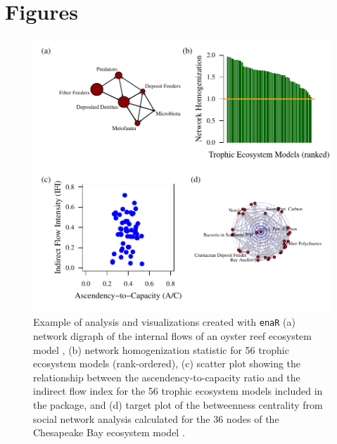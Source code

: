 \documentclass[11pt]{article}
\newcommand{\enaR}{\texttt{enaR}}
\begin{document}
\section{Figures}

\begin{figure}[h]
\includegraphics[scale=1]{../figures/enaR_plot_example.pdf}
\caption{Example of analysis and visualizations created with \enaR\:
  (a) network digraph of the internal flows of an oyster reef
  ecosystem model \citep{dame81}, (b) network homogenization statistic
  for 56 trophic ecosystem models (rank-ordered), (c) scatter plot
  showing the relationship between the ascendency-to-capacity ratio
  and the indirect flow index for the 56 trophic ecosystem models
  included in the package, and (d) target plot of the betweenness centrality from
  social network analysis calculated for the 36 nodes of the
  Chesapeake Bay ecosystem model \citep{baird89}. } \label{fig:example}
\end{figure}
\end{document}
